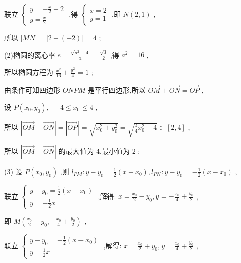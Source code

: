 \documentclass[10pt]{article}
\begin{document}
联立 \(\left\{  \begin{array}{l} y =  - \frac{x}{2} + 2 \\  y = \frac{x}{2} \end{array}\right.\) ,得 \(\left\{  \begin{array}{l} x = 2 \\  y = 1 \end{array}\right.\) ,即 \(N\left( {2,1}\right)\) ,

所以 \(\left| {MN}\right|  = \left| {2 - \left( {-2}\right) }\right|  = 4\) ;

(2)椭圆的离心率 \(e = \frac{\sqrt{{a}^{2} - 4}}{a} = \frac{\sqrt{3}}{2}\) ,得 \({a}^{2} = {16}\) ,

所以椭圆方程为 \(\frac{{x}^{2}}{16} + \frac{{y}^{2}}{4} = 1\) ;

由条件可知四边形 \({ONPM}\) 是平行四边形,所以 \(\overrightarrow{OM} + \overrightarrow{ON} = \overrightarrow{OP}\) ,

设 \(P\left( {{x}_{0},{y}_{0}}\right) ,\; - 4 \leq  {x}_{0} \leq  4\) ,

所以 \(\left| {\overrightarrow{OM} + \overrightarrow{ON}}\right|  = \left| \overrightarrow{OP}\right|  = \sqrt{{x}_{0}^{2} + {y}_{0}^{2}} = \sqrt{\frac{3}{4}{x}_{0}^{2} + 4} \in  \left\lbrack  {2,4}\right\rbrack\) ,

所以 \(\left| {\overrightarrow{OM} + \overrightarrow{ON}}\right|\) 的最大值为 4,最小值为 2 ;

(3) 设 \(P\left( {{x}_{0},{y}_{0}}\right)\) ,则 \({l}_{PM} : y - {y}_{0} = \frac{1}{2}\left( {x - {x}_{0}}\right) ,{l}_{PN} : y - {y}_{0} =  - \frac{1}{2}\left( {x - {x}_{0}}\right)\) ,

联立 \(\left\{  \begin{array}{l} y - {y}_{0} = \frac{1}{2}\left( {x - {x}_{0}}\right) \\  y =  - \frac{1}{2}x \end{array}\right.\) ,解得: \(x = \frac{{x}_{0}}{2} - {y}_{0}, y =  - \frac{{x}_{0}}{4} + \frac{{y}_{0}}{2}\) ,

即 \(M\left( {\frac{{x}_{0}}{2} - {y}_{0}, - \frac{{x}_{0}}{4} + \frac{{y}_{0}}{2}}\right)\) ,

联立 \(\left\{  \begin{array}{l} y - {y}_{0} =  - \frac{1}{2}\left( {x - {x}_{0}}\right) \\  y = \frac{1}{2}x \end{array}\right.\) ,解得: \(x = \frac{{x}_{0}}{2} + {y}_{0}, y = \frac{{x}_{0}}{4} + \frac{{y}_{0}}{2}\) ,
\end{document}
